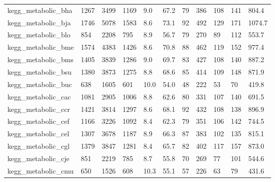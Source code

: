 \begin{longtable}{lllllllllll}
 kegg\_metabolic\_bha                                 & 1267       & 3499      & 1169  & 9.0    & 67.2   & 79    & 386    & 108    & 141    & 804.4   \\
 kegg\_metabolic\_bja                                 & 1746       & 5078      & 1583  & 8.6    & 73.1   & 92    & 492    & 129    & 171    & 1074.7  \\
 kegg\_metabolic\_blo                                 & 854        & 2208      & 795   & 8.9    & 56.7   & 79    & 270    & 89     & 112    & 553.7   \\
 kegg\_metabolic\_bme                                 & 1574       & 4383      & 1426  & 8.6    & 70.8   & 88    & 462    & 119    & 152    & 977.4   \\
 kegg\_metabolic\_bms                                 & 1405       & 3839      & 1286  & 9.0    & 69.7   & 83    & 427    & 108    & 140    & 887.2   \\
 kegg\_metabolic\_bsu                                 & 1380       & 3873      & 1275  & 8.8    & 68.6   & 85    & 414    & 109    & 148    & 871.9   \\
 kegg\_metabolic\_buc                                 & 638        & 1605      & 601   & 10.0   & 54.0   & 48    & 222    & 53     & 70     & 419.8   \\
 kegg\_metabolic\_cac                                 & 1081       & 2905      & 1006  & 8.8    & 62.6   & 80    & 331    & 107    & 140    & 691.5   \\
 kegg\_metabolic\_ccr                                 & 1421       & 3814      & 1297  & 8.6    & 68.1   & 92    & 432    & 108    & 138    & 896.9   \\
 kegg\_metabolic\_cef                                 & 1166       & 3226      & 1092  & 8.4    & 62.3   & 79    & 351    & 106    & 142    & 744.5   \\
 kegg\_metabolic\_cel                                 & 1307       & 3678      & 1187  & 8.9    & 66.3   & 87    & 383    & 102    & 135    & 815.1   \\
 kegg\_metabolic\_cgl                                 & 1379       & 3847      & 1281  & 8.4    & 65.7   & 82    & 402    & 117    & 157    & 873.0   \\
 kegg\_metabolic\_cje                                 & 851        & 2219      & 785   & 8.7    & 55.8   & 70    & 269    & 77     & 101    & 544.6   \\
 kegg\_metabolic\_cmu                                 & 650        & 1526      & 608   & 10.3   & 55.1   & 57    & 226    & 63     & 79     & 431.6   \\

\end{longtable}
